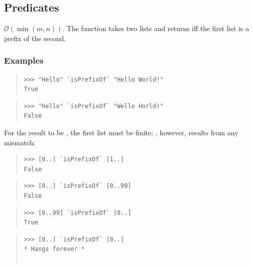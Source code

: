 \subsection{Predicates}
\begin{haddockdesc}
\item[\begin{tabular}{@{}l}
isPrefixOf :: Eq a => {\char 91}a{\char 93} -> {\char 91}a{\char 93} -> Bool
\end{tabular}]
{\haddockbegindoc
\(\mathcal{O}(\min(m,n))\). The  function takes two lists and
 returns  iff the first list is a prefix of the second.\par
\subsubsection*{\textbf{Examples}}
\begin{quote}
{\haddockverb\begin{verbatim}
>>> "Hello" `isPrefixOf` "Hello World!"
True

\end{verbatim}}
\end{quote}
\begin{quote}
{\haddockverb\begin{verbatim}
>>> "Hello" `isPrefixOf` "Wello Horld!"
False

\end{verbatim}}
\end{quote}
For the result to be , the first list must be finite;
 , however, results from any mismatch:\par
\begin{quote}
{\haddockverb\begin{verbatim}
>>> [0..] `isPrefixOf` [1..]
False

\end{verbatim}}
\end{quote}
\begin{quote}
{\haddockverb\begin{verbatim}
>>> [0..] `isPrefixOf` [0..99]
False

\end{verbatim}}
\end{quote}
\begin{quote}
{\haddockverb\begin{verbatim}
>>> [0..99] `isPrefixOf` [0..]
True

\end{verbatim}}
\end{quote}
\begin{quote}
{\haddockverb\begin{verbatim}
>>> [0..] `isPrefixOf` [0..]
* Hangs forever *


\end{verbatim}}
\end{quote}}
\end{haddockdesc}
